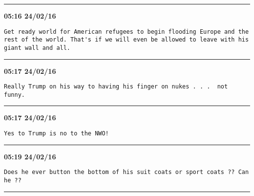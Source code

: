 \hrule%

\begin{adjustwidth}{0cm}{0cm}
\footnotesize \textbf{05:16 24/02/16}

\begin{lstlisting}[breaklines, breakatwhitespace, basicstyle=\small, frame=leftline]
Get ready world for American refugees to begin flooding Europe and the rest of the world. That's if we will even be allowed to leave with his giant wall and all.
\end{lstlisting}
\end{adjustwidth}

\hrule%

\begin{adjustwidth}{0cm}{0cm}
\footnotesize \textbf{05:17 24/02/16}

\begin{lstlisting}[breaklines, breakatwhitespace, basicstyle=\small, frame=leftline]
Really Trump on his way to having his finger on nukes . . .  not funny.
\end{lstlisting}
\end{adjustwidth}

\hrule%

\begin{adjustwidth}{0cm}{0cm}
\footnotesize \textbf{05:17 24/02/16}

\begin{lstlisting}[breaklines, breakatwhitespace, basicstyle=\small, frame=leftline]
Yes to Trump is no to the NWO!
\end{lstlisting}
\end{adjustwidth}

\hrule%

\begin{adjustwidth}{0cm}{0cm}
\footnotesize \textbf{05:19 24/02/16}

\begin{lstlisting}[breaklines, breakatwhitespace, basicstyle=\small, frame=leftline]
Does he ever button the bottom of his suit coats or sport coats ?? Can he ??
\end{lstlisting}
\end{adjustwidth}

\hrule%

